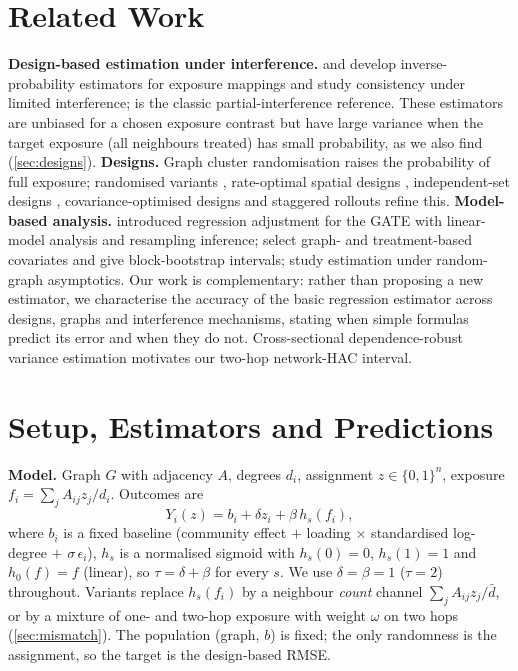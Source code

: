 \documentclass{article}
\theoremstyle{plain}
\theoremstyle{remark}
\begin{document}
\section{Related Work}
\textbf{Design-based estimation under interference.} \citet{aronow2017} and \citet{savje2021} develop inverse-probability estimators for exposure mappings and study consistency under limited interference; \citet{hudgens2008} is the classic partial-interference reference. These estimators are unbiased for a chosen exposure contrast but have large variance when the target exposure (all neighbours treated) has small probability, as we also find (\cref{sec:designs}). \textbf{Designs.} Graph cluster randomisation \citep{ugander2013,eckles2017,karrer2021} raises the probability of full exposure; randomised variants \citep{ugander2020}, rate-optimal spatial designs \citep{leung2022}, independent-set designs \citep{cai2023}, covariance-optimised designs \citep{chen2023} and staggered rollouts \citep{cortez2022} refine this. \textbf{Model-based analysis.} \citet{chin2019} introduced regression adjustment for the GATE with linear-model analysis and resampling inference; \citet{han2023} select graph- and treatment-based covariates and give block-bootstrap intervals; \citet{li2022} study estimation under random-graph asymptotics. Our work is complementary: rather than proposing a new estimator, we characterise the accuracy of the basic regression estimator across designs, graphs and interference mechanisms, stating when simple formulas predict its error and when they do not. Cross-sectional dependence-robust variance estimation \citep{conley1999} motivates our two-hop network-HAC interval.

\section{Setup, Estimators and Predictions}\label{sec:theory}
\textbf{Model.} Graph $G$ with adjacency $A$, degrees $d_i$, assignment $z\in\{0,1\}^n$, exposure $f_i=\sum_jA_{ij}z_j/d_i$. Outcomes are
\begin{equation}
Y_i(z)=b_i+\delta z_i+\beta\,h_s(f_i),
\end{equation}
where $b_i$ is a fixed baseline (community effect $+$ loading $\times$ standardised log-degree $+$ $\sigma\,\epsilon_i$), $h_s$ is a normalised sigmoid with $h_s(0)=0$, $h_s(1)=1$ and $h_0(f)=f$ (linear), so $\tau=\delta+\beta$ for every $s$. We use $\delta=\beta=1$ ($\tau=2$) throughout. Variants replace $h_s(f_i)$ by a neighbour \emph{count} channel $\sum_jA_{ij}z_j/\bar d$, or by a mixture of one- and two-hop exposure with weight $\omega$ on two hops (\cref{sec:mismatch}). The population (graph, $b$) is fixed; the only randomness is the assignment, so the target is the design-based RMSE.
\end{document}
